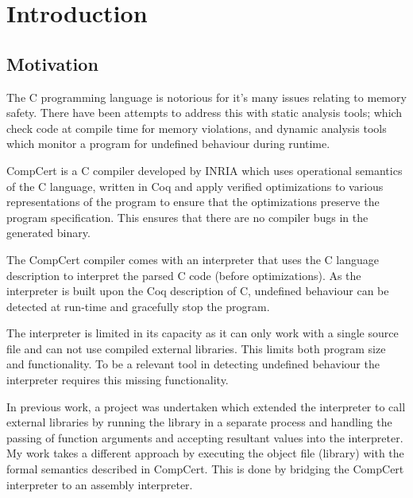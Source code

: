 \chapter{Introduction}\label{introduction}

\section{Motivation}\label{motivation}


The C programming language is notorious for it's many issues relating to memory safety\cite{common-bugs}. There have been attempts to address this with static analysis tools\cite{kremenek2008finding, calcagno2011infer, chess2004static}; which check code at compile time for memory violations, and dynamic analysis tools\cite{ernst2007daikon, serebryany2012addresssanitizer, seward2005using} which monitor a program for undefined behaviour during runtime.

CompCert\cite{leroy2012compcert} is a C compiler developed by INRIA which uses operational semantics of the C language, written in Coq\cite{coq_website} and apply verified optimizations to various representations of the program to ensure that the optimizations preserve the program specification. This ensures that there are no compiler bugs in the generated binary.

The CompCert compiler comes with an interpreter that uses the C language description\cite{iso_standard} to interpret the parsed C code (before optimizations). As the interpreter is built upon the Coq description of C, undefined behaviour can be detected at run-time and gracefully stop the program.

The interpreter is limited in its capacity as it can only work
with a single source file and can not use compiled external libraries. This limits both program size and functionality. To be a relevant tool in detecting undefined behaviour the interpreter requires this missing functionality.

In previous work\cite{linking-rigorous}, a project was undertaken which extended the interpreter to call external libraries by running the library in a separate process and handling the passing of function arguments and accepting resultant values into the interpreter. My work takes a different approach by executing the object file (library) with the formal semantics described in CompCert. This is done by bridging the CompCert interpreter to an assembly interpreter.

